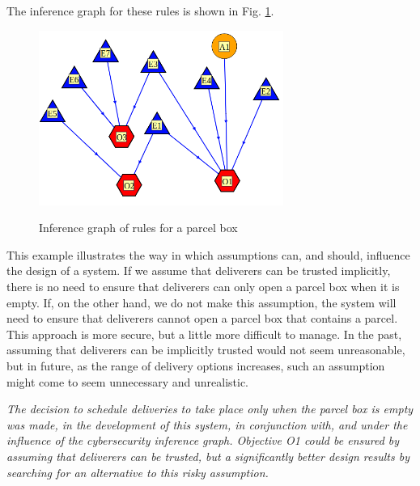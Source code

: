 The inference graph for these rules is shown in Fig. \ref{parcelboxrules}.
\begin{figure}[bhpt]
	\begin{centering}
		\leavevmode\includegraphics[width=8cm]{figures/parcelboxrules3.png}\ \\
		\caption{Inference graph of rules for a parcel box}\label{parcelboxrules}
	\end{centering}
\end{figure}

This example illustrates the way in which assumptions can, and should, influence the design of a system. If we assume that deliverers can be trusted implicitly, there is no need to ensure that deliverers can only open a parcel box when it is empty. If, on the other hand, we do not make this assumption, the system will need to ensure that deliverers cannot open a parcel box that contains a parcel. This approach is more secure, but a little more difficult to manage. In the past, assuming that deliverers can be implicitly trusted would not seem unreasonable, but in future, as the range of delivery options increases, such an assumption might come to seem unnecessary and unrealistic.

{\em The decision to schedule deliveries to take place only when the parcel box is empty
was made, in the development of this system, in conjunction with, and under the influence
of the cybersecurity inference graph. Objective O1 could be ensured by {\em assuming that
deliverers can be trusted}, but a significantly better design results by searching for 
an alternative to this risky assumption.}

